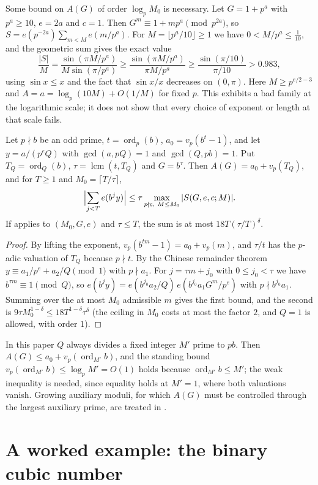 \documentclass[11pt]{article}
\DeclareMathOperator{\ord}{ord}
\DeclareMathOperator{\lcm}{lcm}
\begin{document}
Some bound on $A(G)$ of order $\log_pM_0$ is necessary. Let $G=1+p^a$ with $p^a\ge10$, $e=2a$ and
$c=1$. Then $G^m\equiv1+mp^a\pmod{p^{2a}}$, so $S=e(p^{-2a})\sum_{m<M}e(m/p^a)$. For
$M=\lfloor p^a/10\rfloor\ge1$ we have $0<M/p^a\le\frac1{10}$, and the geometric sum gives the exact value
\[
\frac{|S|}M=\frac{\sin(\pi M/p^a)}{M\sin(\pi/p^a)}\ge\frac{\sin(\pi M/p^a)}{\pi M/p^a}\ge
\frac{\sin(\pi/10)}{\pi/10}>0.983,
\]
using $\sin x\le x$ and the fact that $\sin x/x$ decreases on $(0,\pi)$. Here $M\ge p^{e/2-3}$ and
$A=a=\log_p(10M)+O(1/M)$ for fixed $p$. This exhibits a bad family at the logarithmic scale; it does not
show that every choice of exponent or length at that scale fails.

\begin{corollary}\label{cor:split}
Let $p\nmid b$ be an odd prime, $t=\ord_p(b)$, $a_0=v_p(b^t-1)$, and let $y=a/(p^eQ)$ with
$\gcd(a,pQ)=1$ and $\gcd(Q,pb)=1$. Put $T_Q=\ord_Q(b)$, $\tau=\lcm(t,T_Q)$ and $G=b^\tau$. Then
$A(G)=a_0+v_p(T_Q)$, and for $T\ge1$ and $M_0=\lceil T/\tau\rceil$,
\[
\Bigl|\sum_{j<T}e(b^jy)\Bigr|\le\tau\max_{p\nmid c,\ M\le M_0}|S(G,e,c;M)|.
\]
If  applies to $(M_0,G,e)$ and $\tau\le T$, the sum is at most $18T(\tau/T)^\delta$.
\end{corollary}

\begin{proof}
By lifting the exponent, $v_p(b^{tm}-1)=a_0+v_p(m)$, and $\tau/t$ has the $p$-adic valuation of $T_Q$
because $p\nmid t$. By the Chinese remainder theorem $y\equiv a_1/p^e+a_2/Q\pmod1$ with $p\nmid a_1$.
For $j=\tau m+j_0$ with $0\le j_0<\tau$ we have $b^{\tau m}\equiv1\pmod Q$, so
$e(b^jy)=e(b^{j_0}a_2/Q)\,e(b^{j_0}a_1G^m/p^e)$ with $p\nmid b^{j_0}a_1$. Summing over the at most $M_0$
admissible $m$ gives the first bound, and the second is $9\tau M_0^{1-\delta}\le18T^{1-\delta}\tau^\delta$
(the ceiling in $M_0$ costs at most the factor $2$, and $Q=1$ is allowed, with order $1$).
\end{proof}

In this paper $Q$ always divides a fixed integer $M'$ prime to $pb$. Then $A(G)\le a_0+v_p(\ord_{M'}b)$, and
the standing bound $v_p(\ord_{M'}b)\le\log_pM'=O(1)$ holds because $\ord_{M'}b\le M'$; the weak inequality
is needed, since equality holds at $M'=1$, where both valuations vanish. Growing auxiliary moduli, for which
$A(G)$ must be controlled through the largest auxiliary prime, are treated in \cite{PaperXII}.

\section{A worked example: the binary cubic number}\label{sec:example}
\end{document}
